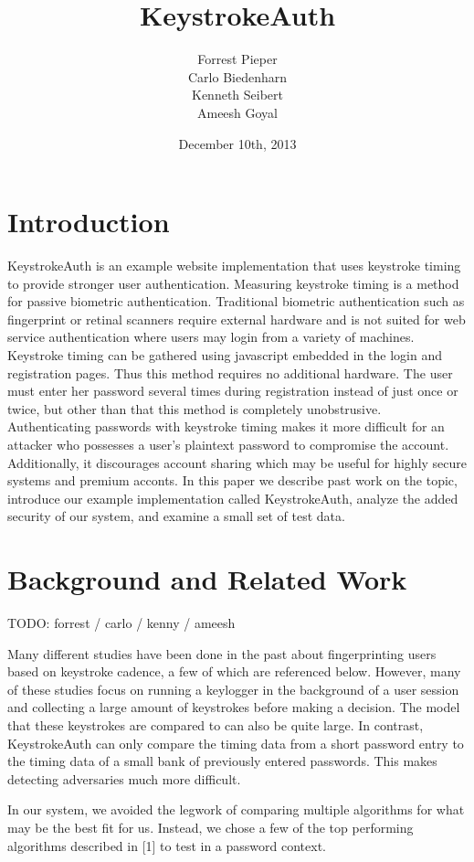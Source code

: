 \documentclass{article}
\title{KeystrokeAuth}
\author{
  Forrest Pieper\\
  Carlo Biedenharn\\
  Kenneth Seibert\\
  Ameesh Goyal
}
\date{December 10th, 2013}
\begin{document}
\maketitle

\abstract{
}

\section{Introduction}
\label{introduction}
KeystrokeAuth is an example website implementation that uses keystroke timing to provide stronger user authentication.
Measuring keystroke timing is a method for passive biometric authentication. 
Traditional biometric authentication such as fingerprint or retinal scanners require external hardware and is not suited for web service authentication where users may login from a variety of machines. 
Keystroke timing can be gathered using javascript embedded in the login and registration pages.
Thus this method requires no additional hardware.
The user must enter her password several times during registration instead of just once or twice, but other than that this method is completely unobstrusive.
Authenticating passwords with keystroke timing makes it more difficult for an attacker who possesses a user's plaintext password to compromise the account.
Additionally, it discourages account sharing which may be useful for highly secure systems and premium acconts.
In this paper we describe past work on the topic, introduce our example implementation called KeystrokeAuth, analyze the added security of our system, and examine a small set of test data.

\section{Background and Related Work}
TODO: forrest / carlo / kenny / ameesh

Many different studies have been done in the past about fingerprinting users based on keystroke cadence, a few of which are referenced below. However, many of these studies focus on running a keylogger in the background of a user session and collecting a large amount of keystrokes before making a decision. The model that these keystrokes are compared to can also be quite large. In contrast, KeystrokeAuth can only compare the timing data from a short password entry to the timing data of a small bank of previously entered passwords. This makes detecting adversaries much more difficult.

In our system, we avoided the legwork of comparing multiple algorithms for what may be the best fit for us. Instead, we chose a few of the top performing algorithms described in {[}1{]} to test in a password context. 
\end{document}
